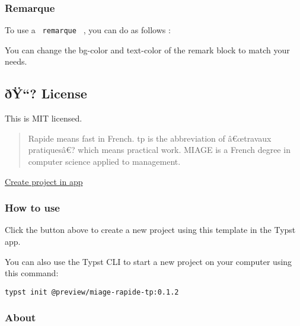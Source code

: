 \subsubsection{Remarque}\label{remarque}

To use a \texttt{\ remarque\ } , you can do as follows :

\begin{Shaded}
\begin{Highlighting}[]
\end{Highlighting}
\end{Shaded}

You can change the bg-color and text-color of the remark block to match
your needs.

\subsection{ðŸ``? License}\label{uxf0uxff-license}

This is MIT licensed.

\begin{quote}
Rapide means fast in French. tp is the abbreviation of â€œtravaux
pratiquesâ€? which means practical work. MIAGE is a French degree in
computer science applied to management.
\end{quote}

\href{/app?template=miage-rapide-tp&version=0.1.2}{Create project in
app}

\subsubsection{How to use}\label{how-to-use}

Click the button above to create a new project using this template in
the Typst app.

You can also use the Typst CLI to start a new project on your computer
using this command:

\begin{verbatim}
typst init @preview/miage-rapide-tp:0.1.2
\end{verbatim}



\subsubsection{About}\label{about}

